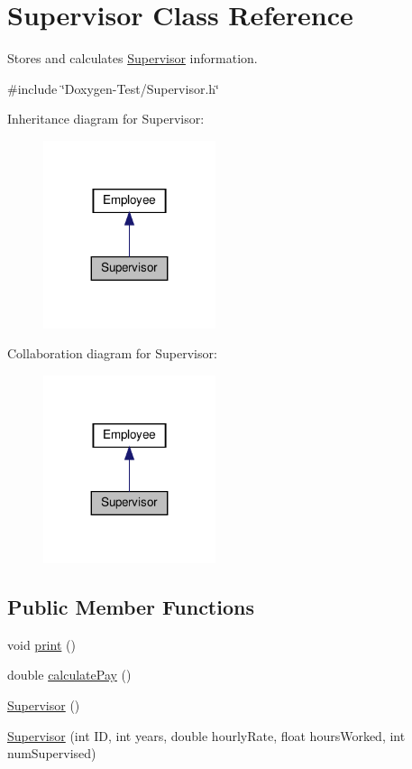 \hypertarget{classSupervisor}{}\section{Supervisor Class Reference}
\label{classSupervisor}


Stores and calculates \hyperlink{classSupervisor}{Supervisor} information.  




{\ttfamily \#include \char`\"{}Doxygen-\/\+Test/\+Supervisor.\+h\char`\"{}}



Inheritance diagram for Supervisor\+:
\nopagebreak
\begin{figure}[H]
\begin{center}
\leavevmode
\includegraphics[width=143pt]{classSupervisor__inherit__graph}
\end{center}
\end{figure}


Collaboration diagram for Supervisor\+:
\nopagebreak
\begin{figure}[H]
\begin{center}
\leavevmode
\includegraphics[width=143pt]{classSupervisor__coll__graph}
\end{center}
\end{figure}
\subsection*{Public Member Functions}
\begin{DoxyCompactItemize}
\item 
void \hyperlink{classSupervisor_a92483dc9a54904d79b46c6ec4efb3f54}{print} ()
\item 
double \hyperlink{classSupervisor_aa37daa89523c08b84ae8141299e036f8}{calculate\+Pay} ()
\item 
\hyperlink{classSupervisor_a9d7eafc36b5429092ba0f758bc7841c4}{Supervisor} ()
\item 
\hyperlink{classSupervisor_a02d9245744652deb20e9408001d6ed3b}{Supervisor} (int ID, int years, double hourly\+Rate, float hours\+Worked, int num\+Supervised)
\end{DoxyCompactItemize}
